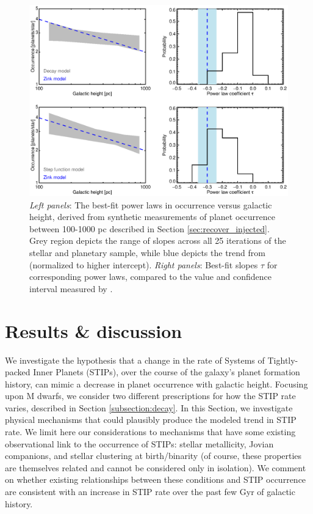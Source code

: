 \documentclass[twocolumn]{aastex631}
\begin{document}
\begin{figure}
    \centering
    \includegraphics[trim={0.5cm 0 0.5cm 0}, width=6.0in]{figures/occurrence_figures_galheight.eps}
    \caption{\textit{Left panels}: The best-fit power laws in occurrence versus galactic height, derived from  synthetic measurements of planet occurrence between 100-1000 pc described in Section \ref{sec:recover_injected}. Grey region depicts the range of slopes across all 25 iterations of the stellar and planetary sample, while blue depicts the trend from \cite{zink_scaling_2023} (normalized to higher intercept). \textit{Right panels}: Best-fit slopes $\tau$ for corresponding power laws, compared to the value and confidence interval measured by \cite{zink_scaling_2023}.}
    \label{fig:compare_to_zink}
\end{figure}

\section{Results \& discussion}
\label{sec:results}

We investigate the hypothesis that a change in the rate of Systems of Tightly-packed Inner Planets (STIPs), over the course of the galaxy's planet formation history, can mimic a decrease in planet occurrence with galactic height. Focusing upon M dwarfs, we consider two different prescriptions for how the STIP rate varies, described in Section \ref{subsection:decay}. In this Section, we investigate physical mechanisms that could plausibly produce the modeled trend in STIP rate. We limit here our considerations to mechanisms that have some existing observational link to the occurrence of STIPs: stellar metallicity, Jovian companions, and stellar clustering at birth/binarity (of course, these properties are themselves related and cannot be considered only in isolation). We comment on whether existing relationships between these conditions and STIP occurrence are consistent with an increase in STIP rate over the past few Gyr of galactic history.  
\end{document}
